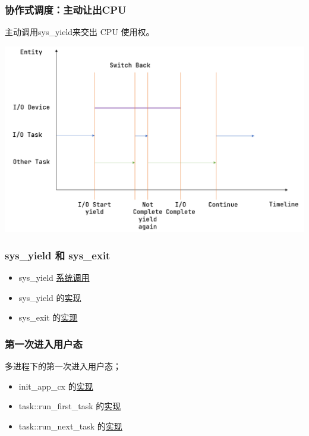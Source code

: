 \begin{frame}
	\frametitle{协作式调度：主动让出CPU}
% 
主动调用sys\_yield来交出 CPU 使用权。

\includegraphics[width=0.7\linewidth]{figs/multiprogramming.png}
\end{frame}
\begin{frame}
	\frametitle{sys\_yield 和 sys\_exit}
% 
\begin{itemize}
	\item sys\_yield \href{https://github.com/rcore-os/rCore-Tutorial-v3/blob/ch3/user/src/syscall.rs\#L27}{系统调用}
	\item  sys\_yield 的\href{https://github.com/rcore-os/rCore-Tutorial-v3/blob/ch3/os/src/syscall/process.rs\#L13}{实现}
	\item  sys\_exit 的\href{https://github.com/rcore-os/rCore-Tutorial-v3/blob/ch3/os/src/syscall/process.rs\#L7}{实现}	
\end{itemize}
\end{frame}
\begin{frame}
	\frametitle{第一次进入用户态}
% 
多进程下的第一次进入用户态；
% 
\begin{itemize}
	\item init\_app\_cx 的\href{https://github.com/rcore-os/rCore-Tutorial-v3/blob/ch3/os/src/loader.rs\#L82}{实现}
	\item task::run\_first\_task 的\href{https://github.com/rcore-os/rCore-Tutorial-v3/blob/ch3/os/src/task/mod.rs\#L48}{实现}
	\item  task::run\_next\_task 的\href{https://github.com/rcore-os/rCore-Tutorial-v3/blob/ch3/os/src/task/mod.rs\#L82}{实现}
\end{itemize}
\end{frame}
